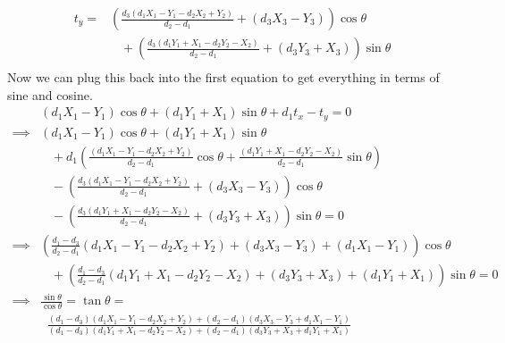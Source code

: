 \documentclass[11pt,english]{article}
\begin{document}
\begin{enumerate}
\begin{align*}
t_y =& \left( \frac{d_3(d_1 X_1 - Y_1 - d_2 X_2 + Y_2)}{d_2 - d_1} + (d_3 X_3 - Y_3) \right) \cos\theta \\
& \;\;\; + \left( \frac{d_3(d_1 Y_1 + X_1 - d_2 Y_2 - X_2)}{d_2 - d_1}+(d_3 Y_3 + X_3)\right) \sin\theta  \\
\end{align*}
Now we can plug this back into the first equation to get everything in terms of sine and cosine.
\begin{align*}
& (d_1 X_1 - Y_1)\cos\theta + (d_1 Y_1 + X_1)\sin\theta + d_1 t_x  - t_y = 0 \\
\implies & (d_1 X_1 - Y_1)\cos\theta + (d_1 Y_1 + X_1)\sin\theta \\
& \;\;\; + d_1
	\left(\frac{(d_1 X_1 - Y_1 - d_2 X_2 + Y_2)}{d_2 - d_1}\cos\theta
		+ \frac{(d_1 Y_1 + X_1 - d_2 Y_2 - X_2)}{d_2 - d_1}\sin\theta \right) \\
&\;\;\; - \left( \frac{d_3(d_1 X_1 - Y_1 - d_2 X_2 + Y_2)}{d_2 - d_1} + (d_3 X_3 - Y_3) \right) \cos\theta \\
& \;\;\; - \left( \frac{d_3(d_1 Y_1 + X_1 - d_2 Y_2 - X_2)}{d_2 - d_1}+(d_3 Y_3 + X_3)\right) \sin\theta = 0\\
\implies 
& \left( \frac{d_1-d_3}{d_2 - d_1}(d_1 X_1 - Y_1 - d_2 X_2 + Y_2)
	+ (d_3 X_3 - Y_3) + (d_1 X_1 - Y_1) \right) \cos\theta \\
& \;\;\; + \left( \frac{d_1-d_3}{d_2 - d_1}(d_1 Y_1 + X_1 - d_2 Y_2 - X_2)
	+ (d_3 Y_3 + X_3) + (d_1 Y_1 + X_1) \right) \sin\theta = 0\\
\implies 
& \frac{\sin \theta}{\cos \theta} = \tan\theta = \\
&\;\; \frac{(d_1-d_3)(d_1 X_1 - Y_1 - d_2 X_2 + Y_2) + (d_2 - d_1)(d_3 X_3 - Y_3 + d_1 X_1 - Y_1)}
		{(d_1-d_3)(d_1 Y_1 + X_1 - d_2 Y_2 - X_2) + (d_2 - d_1)(d_3 Y_3 + X_3 + d_1 Y_1 + X_1)}  \\
\end{align*}


\end{enumerate}
\end{document}
